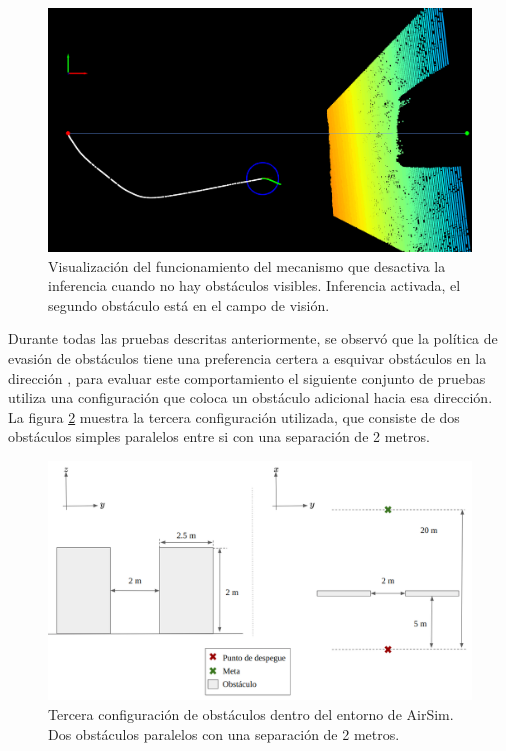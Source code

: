 \begin{figure}[H]
    \centering
    \includegraphics[scale=0.225]{partes/img/depth-dual-panel-3-second-obs.png}
    \caption[Visualización del funcionamiento del mecanismo que desactiva la inferencia cuando no hay obstáculos visibles. Inferencia activada, el segundo obstáculo está en el campo de visión.]{Visualización del funcionamiento del mecanismo que desactiva la inferencia cuando no hay obstáculos visibles. Inferencia activada, el segundo obstáculo está en el campo de visión.}
    \label{fig:depth-dual-panel-3}
\end{figure}

Durante todas las pruebas descritas anteriormente, se observó que la política de evasión de obstáculos tiene una preferencia certera a esquivar obstáculos en la dirección , para evaluar este comportamiento el siguiente conjunto de pruebas utiliza una configuración que coloca un obstáculo adicional hacia esa dirección. La figura \ref{fig:config-3-parallel} muestra la tercera configuración utilizada, que consiste de dos obstáculos simples paralelos entre si con una separación de 2 metros.

\begin{figure}[H]
    \centering
    \includegraphics[scale=0.35]{partes/img/config-3-parallel.png}
    \caption[Tercera configuración de obstáculos dentro del entorno de AirSim.]{Tercera configuración de obstáculos dentro del entorno de AirSim. Dos obstáculos paralelos con una separación de 2 metros.}
    \label{fig:config-3-parallel}
\end{figure}

